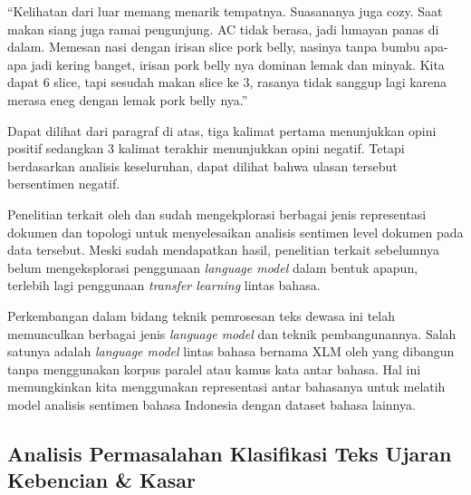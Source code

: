 	“Kelihatan dari luar memang menarik tempatnya. Suasananya juga cozy. Saat makan siang juga ramai pengunjung. AC tidak berasa, jadi lumayan panas di dalam. Memesan nasi dengan irisan slice pork belly, nasinya tanpa bumbu apa- apa jadi kering banget, irisan pork belly nya dominan lemak dan minyak. Kita dapat 6 slice, tapi sesudah makan slice ke 3, rasanya tidak sanggup lagi karena merasa eneg dengan lemak pork belly nya.”

	Dapat dilihat dari paragraf di atas, tiga kalimat pertama menunjukkan opini positif sedangkan 3 kalimat terakhir menunjukkan opini negatif. Tetapi berdasarkan analisis keseluruhan, dapat dilihat bahwa ulasan tersebut bersentimen negatif.

	Penelitian terkait oleh \parencite{FarhanKhodra2017} dan \parencite{CrisdayantiPurwarianti2019} sudah mengekplorasi berbagai jenis representasi dokumen dan topologi untuk menyelesaikan analisis sentimen level dokumen pada data tersebut. Meski sudah mendapatkan hasil, penelitian terkait sebelumnya belum mengeksplorasi penggunaan \textit{language model} dalam bentuk apapun, terlebih lagi penggunaan \textit{transfer learning} lintas bahasa.

	Perkembangan dalam bidang teknik pemrosesan teks dewasa ini telah memunculkan berbagai jenis \textit{language model} dan teknik pembangunannya. Salah satunya adalah \textit{language model} lintas bahasa bernama XLM oleh \parencite{LampleConneau2019} yang dibangun tanpa menggunakan korpus paralel atau kamus kata antar bahasa. Hal ini memungkinkan kita menggunakan representasi antar bahasanya untuk melatih model analisis sentimen bahasa Indonesia dengan dataset bahasa lainnya.

	\subsection{Analisis Permasalahan Klasifikasi Teks Ujaran Kebencian \& Kasar}




